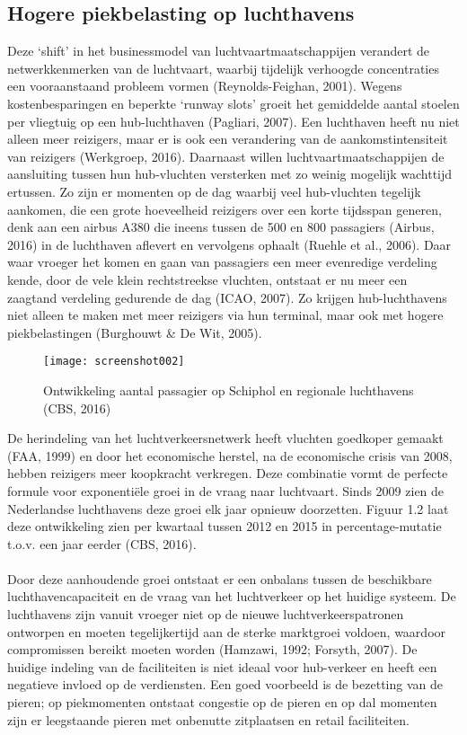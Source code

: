 \subsection{Hogere piekbelasting op luchthavens}
Deze ‘shift’ in het businessmodel van luchtvaartmaatschappijen verandert de netwerkkenmerken van de luchtvaart, waarbij tijdelijk verhoogde concentraties een vooraanstaand probleem vormen (Reynolds-Feighan, 2001). Wegens kostenbesparingen en beperkte ‘runway slots’ groeit het gemiddelde aantal stoelen per vliegtuig op een hub-luchthaven (Pagliari, 2007). Een luchthaven heeft nu niet alleen meer reizigers, maar er is ook een verandering van de aankomstintensiteit van reizigers (Werkgroep, 2016). Daarnaast willen luchtvaartmaatschappijen de aansluiting tussen hun hub-vluchten versterken met zo weinig mogelijk wachttijd ertussen. Zo zijn er momenten op de dag waarbij veel hub-vluchten tegelijk aankomen, die een grote hoeveelheid reizigers over een korte tijdsspan generen, denk aan een airbus A380 die ineens tussen de 500 en 800 passagiers (Airbus, 2016) in de luchthaven aflevert en vervolgens ophaalt (Ruehle et al., 2006). Daar waar vroeger het komen en gaan van passagiers een meer evenredige verdeling kende, door de vele klein rechtstreekse vluchten, ontstaat er nu meer een zaagtand verdeling gedurende de dag (ICAO, 2007). Zo krijgen hub-luchthavens niet alleen te maken met meer reizigers via hun terminal, maar ook met hogere piekbelastingen (Burghouwt \& De Wit, 2005).
\begin{figure}[h]
	\centering
	\texttt{[image: screenshot002]}
	\caption{Ontwikkeling aantal passagier op Schiphol en regionale luchthavens (CBS, 2016)}
	\label{fig:screenshot002}
\end{figure}
De herindeling van het luchtverkeersnetwerk heeft vluchten goedkoper gemaakt (FAA, 1999) en door het economische herstel, na de economische crisis van 2008, hebben reizigers meer koopkracht verkregen. Deze combinatie vormt de perfecte formule voor exponentiële groei in de vraag naar luchtvaart. Sinds 2009 zien de Nederlandse luchthavens deze groei elk jaar opnieuw doorzetten. Figuur 1.2 laat deze ontwikkeling zien per kwartaal tussen 2012 en 2015 in percentage-mutatie t.o.v. een jaar eerder (CBS, 2016).
\\ \\
Door deze aanhoudende groei ontstaat er een onbalans tussen de beschikbare luchthavencapaciteit en de vraag van het luchtverkeer op het huidige systeem. De luchthavens zijn vanuit vroeger niet op de nieuwe luchtverkeerspatronen ontworpen en moeten tegelijkertijd aan de sterke marktgroei voldoen, waardoor compromissen bereikt moeten worden (Hamzawi, 1992; Forsyth, 2007). De huidige indeling van de faciliteiten is niet ideaal voor hub-verkeer en heeft een negatieve invloed op de verdiensten. Een goed voorbeeld is de bezetting van de pieren; op piekmomenten ontstaat congestie op de pieren en op dal momenten zijn er leegstaande pieren met onbenutte zitplaatsen en retail faciliteiten.
